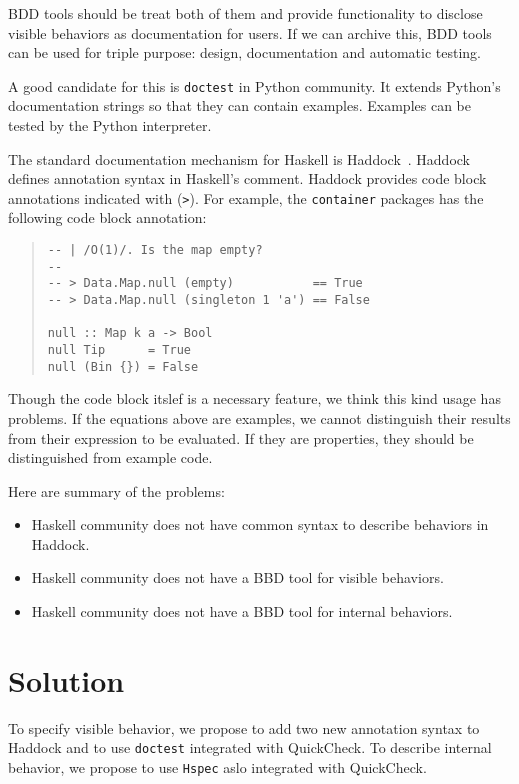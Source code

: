 \documentclass[preprint]{sigplanconf}
\begin{document}
BDD tools should be treat both of them and provide functionality
to disclose visible behaviors as documentation for users.
If we can archive this, BDD tools can be used for
triple purpose: design, documentation and automatic testing.

A good candidate for this is {\tt doctest} in Python community.
It extends Python's documentation strings so that they
can contain examples.
Examples can be tested by the Python interpreter.

The standard documentation mechanism for Haskell is
Haddock~\cite{haddock}.
Haddock defines annotation syntax in Haskell's comment.
Haddock provides code block annotations indicated with ({\tt >}).
For example, the {\tt container} packages has the following code block annotation:

\begin{quote}
\small
\begin{verbatim}
-- | /O(1)/. Is the map empty?
--
-- > Data.Map.null (empty)           == True
-- > Data.Map.null (singleton 1 'a') == False

null :: Map k a -> Bool
null Tip      = True
null (Bin {}) = False
\end{verbatim}
\end{quote}

\noindent Though the code block itslef is a necessary feature,
we think this kind usage has problems.
If the equations above are examples, we cannot distinguish
their results from their expression to be evaluated.
If they are properties, they should be distinguished
from example code.

Here are summary of the problems:

\begin{itemize}
\item Haskell community does not have common syntax to describe
behaviors in Haddock.
\item Haskell community does not have a BBD tool for visible behaviors.
\item Haskell community does not have a BBD tool for internal behaviors.
\end{itemize}

\section{Solution}

To specify visible behavior, we propose to add two new annotation syntax to Haddock and to use {\tt doctest} integrated with QuickCheck. To describe internal behavior, we propose to use {\tt Hspec} aslo integrated with QuickCheck.
\end{document}
